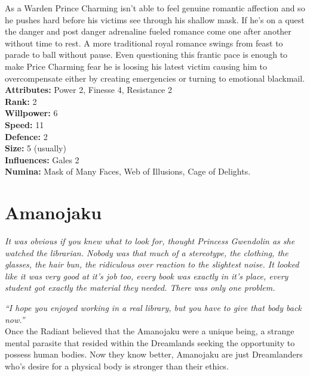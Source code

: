 As a Warden Prince Charming isn't able to feel genuine romantic affection and so he pushes hard before his victims see through his shallow mask. If he's on a quest the danger and post danger adrenaline fueled romance come one after another without time to rest. A more traditional royal romance swings from feast to parade to ball without pause. Even questioning this frantic pace is enough to make Price Charming fear he is loosing his latest victim causing him to overcompensate either by creating emergencies or turning to emotional blackmail. \\

\noindent \textbf{Attributes:} Power 2, Finesse 4, Resistance 2\\

\noindent \textbf{Rank:} 2\\

\noindent \textbf{Willpower:} 6\\

\noindent \textbf{Speed:} 11\\

\noindent \textbf{Defence:} 2\\

\noindent \textbf{Size:} 5 (usually)\\

\noindent \textbf{Influences:} Gales 2\\

\noindent \textbf{Numina:} Mask of Many Faces, Web of Illusions, Cage of Delights. \\

\section*{Amanojaku}

\textit{It was obvious if you knew what to look for, thought Princess Gwendolin as she watched the librarian. Nobody was that much of a stereotype, the clothing, the glasses, the hair bun, the ridiculous over reaction to the slightest noise. It looked like it was very good at it's job too, every book was exactly in it's place, every student got exactly the material they needed. There was only one problem.}

\textit{\textquotedblleft I hope you enjoyed working in a real library, but you have to give that body back now.\textquotedblright}\\

\noindent Once the Radiant believed that the Amanojaku were a unique being, a strange mental parasite that resided within the Dreamlands seeking the opportunity to possess human bodies. Now they know better, Amanojaku are just Dreamlanders who's desire for a physical body is stronger than their ethics. 

